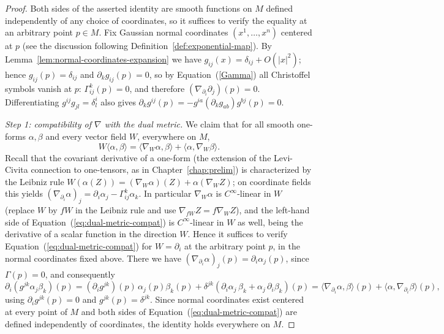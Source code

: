 \begin{proof}
Both sides of the asserted identity are smooth functions on $M$ defined
independently of any choice of coordinates, so it suffices to verify the
equality at an arbitrary point $p\in M$. Fix Gaussian normal coordinates
$(x^1,\ldots,x^n)$ centered at $p$ (see the discussion following
Definition~\ref{def:exponential-map}). By
Lemma~\ref{lem:normal-coordinates-expansion} we have
$g_{ij}(x)=\delta_{ij}+O(|x|^2)$; hence $g_{ij}(p)=\delta_{ij}$ and
$\partial_kg_{ij}(p)=0$, so by Equation~(\ref{Gamma}) all Christoffel
symbols vanish at $p$: $\Gamma^k_{ij}(p)=0$, and therefore
$\left(\nabla_{\partial_i}\partial_j\right)(p)=0$. Differentiating
$g^{ij}g_{jl}=\delta^i_l$ also gives
$\partial_kg^{ij}(p)=-g^{ia}\left(\partial_kg_{ab}\right)g^{bj}(p)=0$.

\emph{Step 1: compatibility of $\nabla$ with the dual metric.} We claim
that for all smooth one-forms $\alpha,\beta$ and every vector field $W$,
everywhere on $M$,
\begin{equation}\label{eq:dual-metric-compat}
W\langle\alpha,\beta\rangle
=\langle\nabla_W\alpha,\beta\rangle+\langle\alpha,\nabla_W\beta\rangle .
\end{equation}
Recall that the covariant derivative of a one-form (the extension of the
Levi-Civita connection to one-tensors, as in Chapter~\ref{chap:prelim}) is
characterized by the Leibniz rule
$W\left(\alpha(Z)\right)=(\nabla_W\alpha)(Z)+\alpha(\nabla_WZ)$; on
coordinate fields this yields
$(\nabla_{\partial_i}\alpha)_j=\partial_i\alpha_j-\Gamma^k_{ij}\alpha_k$.
In particular $\nabla_W\alpha$ is $C^\infty$-linear in $W$ (replace $W$ by
$fW$ in the Leibniz rule and use $\nabla_{fW}Z=f\nabla_WZ$), and the
left-hand side of Equation~(\ref{eq:dual-metric-compat}) is
$C^\infty$-linear in $W$ as well, being the derivative of a scalar
function in the direction $W$. Hence it suffices to verify
Equation~(\ref{eq:dual-metric-compat}) for $W=\partial_i$ at the
arbitrary point $p$, in the normal coordinates fixed above. There we have
$(\nabla_{\partial_i}\alpha)_j(p)=\partial_i\alpha_j(p)$, since
$\Gamma(p)=0$, and consequently
$$\partial_i\left(g^{jk}\alpha_j\beta_k\right)(p)
=\left(\partial_ig^{jk}\right)(p)\,\alpha_j(p)\beta_k(p)
+\delta^{jk}\left(\partial_i\alpha_j\,\beta_k
+\alpha_j\,\partial_i\beta_k\right)(p)
=\langle\nabla_{\partial_i}\alpha,\beta\rangle(p)
+\langle\alpha,\nabla_{\partial_i}\beta\rangle(p),$$
using $\partial_ig^{jk}(p)=0$ and $g^{jk}(p)=\delta^{jk}$. Since normal
coordinates exist centered at every point of $M$ and both sides of
Equation~(\ref{eq:dual-metric-compat}) are defined independently of
coordinates, the identity holds everywhere on $M$.


\end{proof}
